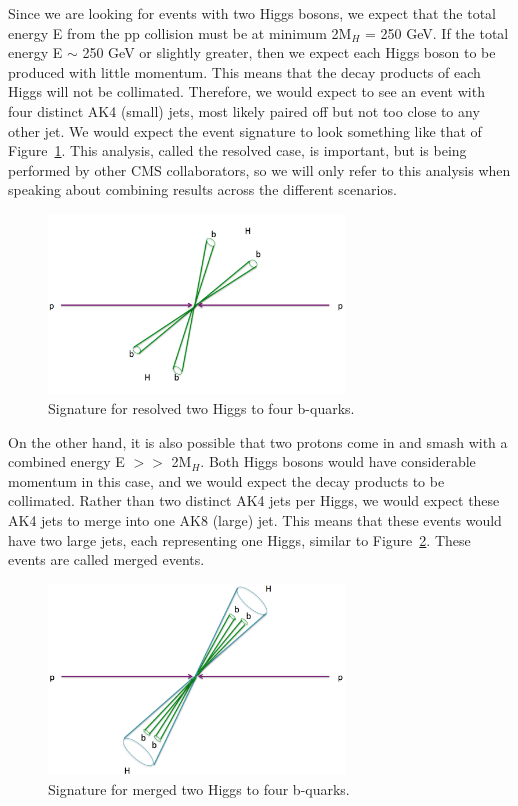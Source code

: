 Since we are looking for events with two Higgs bosons, we expect that the total energy E from the pp collision must be at minimum 2$\text{M}_{H}$ = 250 GeV. If the total energy E $\sim$ 250 GeV or slightly greater, then we expect each Higgs boson to be produced with little momentum. This means that the decay products of each Higgs will not be collimated. Therefore, we would expect to see an event with four distinct AK4 (small) jets, most likely paired off but not too close to any other jet. We would expect the event signature to look something like that of Figure~\ref{Fig:threecases1}. This analysis, called the resolved case, is important, but is being performed by other CMS collaborators, so we will only refer to this analysis when speaking about combining results across the different scenarios.
\begin{figure}[h!]
    \centering
       \includegraphics[width=0.7\textwidth]{F4/resolved.png}
        \caption{Signature for resolved two Higgs to four b-quarks.}
        \label{Fig:threecases1}
\end{figure}

On the other hand, it is also possible that two protons come in and smash with a combined energy E $>>$ 2$\text{M}_{H}$. Both Higgs bosons would have considerable momentum in this case, and we would expect the decay products to be collimated. Rather than two distinct AK4 jets per Higgs, we would expect these AK4 jets to merge into one AK8 (large) jet. This means that these events would have two large jets, each representing one Higgs, similar to Figure~\ref{Fig:threecases2}. These events are called merged events.
\begin{figure}[h!]
    \centering
        \includegraphics[width=0.7\textwidth]{F4/merged.png}
        \caption{Signature for merged two Higgs to four b-quarks.}
        \label{Fig:threecases2}
\end{figure}

